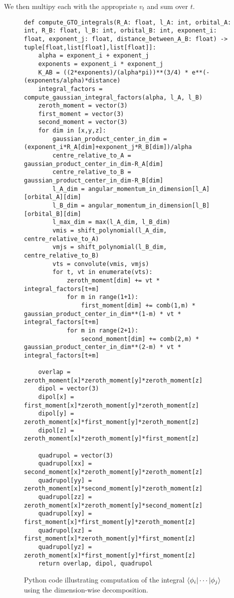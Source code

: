 We then multipy each with the appropriate $v_t$ and sum over $t$.
\begin{figure}[H]
\begin{verbatim}
def compute_GTO_integrals(R_A: float, l_A: int, orbital_A: int, R_B: float, l_B: int, orbital_B: int, exponent_i: float, exponent_j: float, distance_between_A_B: float) -> tuple[float,list[float],list[float]]:
    alpha = exponent_i + exponent_j
    exponents = exponent_i * exponent_j
    K_AB = ((2*exponents)/(alpha*pi))**(3/4) * e**(-(exponents/alpha)*distance)
    integral_factors = compute_gaussian_integral_factors(alpha, l_A, l_B)
    zeroth_moment = vector(3)
    first_moment = vector(3)
    second_moment = vector(3)
    for dim in [x,y,z]:
        gaussian_product_center_in_dim = (exponent_i*R_A[dim]+exponent_j*R_B[dim])/alpha
        centre_relative_to_A = gaussian_product_center_in_dim-R_A[dim]
        centre_relative_to_B = gaussian_product_center_in_dim-R_B[dim]
        l_A_dim = angular_momentum_in_dimension[l_A][orbital_A][dim]
        l_B_dim = angular_momentum_in_dimension[l_B][orbital_B][dim]
        l_max_dim = max(l_A_dim, l_B_dim)
        vmis = shift_polynomial(l_A_dim, centre_relative_to_A)
        vmjs = shift_polynomial(l_B_dim, centre_relative_to_B)
        vts = convolute(vmis, vmjs)
        for t, vt in enumerate(vts):
            zeroth_moment[dim] += vt * integral_factors[t+m]
            for m in range(1+1):
                first_moment[dim] += comb(1,m) * gaussian_product_center_in_dim**(1-m) * vt * integral_factors[t+m]
            for m in range(2+1):
                second_moment[dim] += comb(2,m) * gaussian_product_center_in_dim**(2-m) * vt * integral_factors[t+m]

    overlap = zeroth_moment[x]*zeroth_moment[y]*zeroth_moment[z]
    dipol = vector(3)
    dipol[x] = first_moment[x]*zeroth_moment[y]*zeroth_moment[z]
    dipol[y] = zeroth_moment[x]*first_moment[y]*zeroth_moment[z]
    dipol[z] = zeroth_moment[x]*zeroth_moment[y]*first_moment[z]

    quadrupol = vector(3)
    quadrupol[xx] = second_moment[x]*zeroth_moment[y]*zeroth_moment[z]
    quadrupol[yy] = zeroth_moment[x]*second_moment[y]*zeroth_moment[z]
    quadrupol[zz] = zeroth_moment[x]*zeroth_moment[y]*second_moment[z]
    quadrupol[xy] = first_moment[x]*first_moment[y]*zeroth_moment[z]
    quadrupol[xz] = first_moment[x]*zeroth_moment[y]*first_moment[z]
    quadrupol[yz] = zeroth_moment[x]*first_moment[y]*first_moment[z]
    return overlap, dipol, quadrupol
\end{verbatim}
    \caption{Python code illustrating computation of the integral $\braket{\phi_i|\cdots|\phi_j}$ using the dimension-wise decomposition.}
\end{figure}

